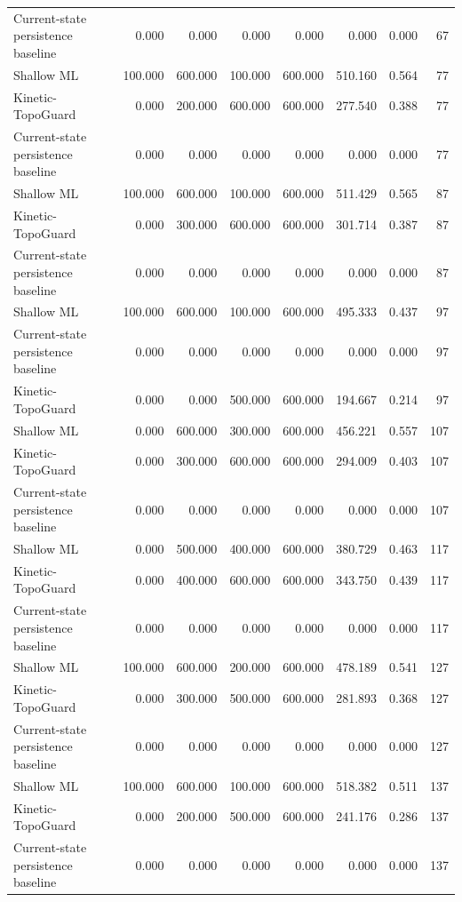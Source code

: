 \begin{tabular}{lrrrrrrr}
Current-state persistence baseline & 0.000 & 0.000 & 0.000 & 0.000 & 0.000 & 0.000 & 67 \\
Shallow ML & 100.000 & 600.000 & 100.000 & 600.000 & 510.160 & 0.564 & 77 \\
Kinetic-TopoGuard & 0.000 & 200.000 & 600.000 & 600.000 & 277.540 & 0.388 & 77 \\
Current-state persistence baseline & 0.000 & 0.000 & 0.000 & 0.000 & 0.000 & 0.000 & 77 \\
Shallow ML & 100.000 & 600.000 & 100.000 & 600.000 & 511.429 & 0.565 & 87 \\
Kinetic-TopoGuard & 0.000 & 300.000 & 600.000 & 600.000 & 301.714 & 0.387 & 87 \\
Current-state persistence baseline & 0.000 & 0.000 & 0.000 & 0.000 & 0.000 & 0.000 & 87 \\
Shallow ML & 100.000 & 600.000 & 100.000 & 600.000 & 495.333 & 0.437 & 97 \\
Current-state persistence baseline & 0.000 & 0.000 & 0.000 & 0.000 & 0.000 & 0.000 & 97 \\
Kinetic-TopoGuard & 0.000 & 0.000 & 500.000 & 600.000 & 194.667 & 0.214 & 97 \\
Shallow ML & 0.000 & 600.000 & 300.000 & 600.000 & 456.221 & 0.557 & 107 \\
Kinetic-TopoGuard & 0.000 & 300.000 & 600.000 & 600.000 & 294.009 & 0.403 & 107 \\
Current-state persistence baseline & 0.000 & 0.000 & 0.000 & 0.000 & 0.000 & 0.000 & 107 \\
Shallow ML & 0.000 & 500.000 & 400.000 & 600.000 & 380.729 & 0.463 & 117 \\
Kinetic-TopoGuard & 0.000 & 400.000 & 600.000 & 600.000 & 343.750 & 0.439 & 117 \\
Current-state persistence baseline & 0.000 & 0.000 & 0.000 & 0.000 & 0.000 & 0.000 & 117 \\
Shallow ML & 100.000 & 600.000 & 200.000 & 600.000 & 478.189 & 0.541 & 127 \\
Kinetic-TopoGuard & 0.000 & 300.000 & 500.000 & 600.000 & 281.893 & 0.368 & 127 \\
Current-state persistence baseline & 0.000 & 0.000 & 0.000 & 0.000 & 0.000 & 0.000 & 127 \\
Shallow ML & 100.000 & 600.000 & 100.000 & 600.000 & 518.382 & 0.511 & 137 \\
Kinetic-TopoGuard & 0.000 & 200.000 & 500.000 & 600.000 & 241.176 & 0.286 & 137 \\
Current-state persistence baseline & 0.000 & 0.000 & 0.000 & 0.000 & 0.000 & 0.000 & 137 \\

\end{tabular}
